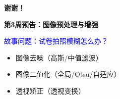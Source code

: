 \begin{frame}
	\begin{center}
		\Huge \textbf{谢谢！}

		\vspace{1cm}

		\Large
		\textbf{第3周预告：图像预处理与增强}

		\vspace{0.5cm}

		\normalsize
		\textcolor{blue}{故事问题：试卷拍照模糊怎么办？}

		\vspace{0.3cm}

		\begin{itemize}
			\item 图像去噪（高斯/中值滤波）
			\item 图像二值化（全局/Otsu/自适应）
			\item 透视矫正（透视变换）
		\end{itemize}
	\end{center}
\end{frame}
